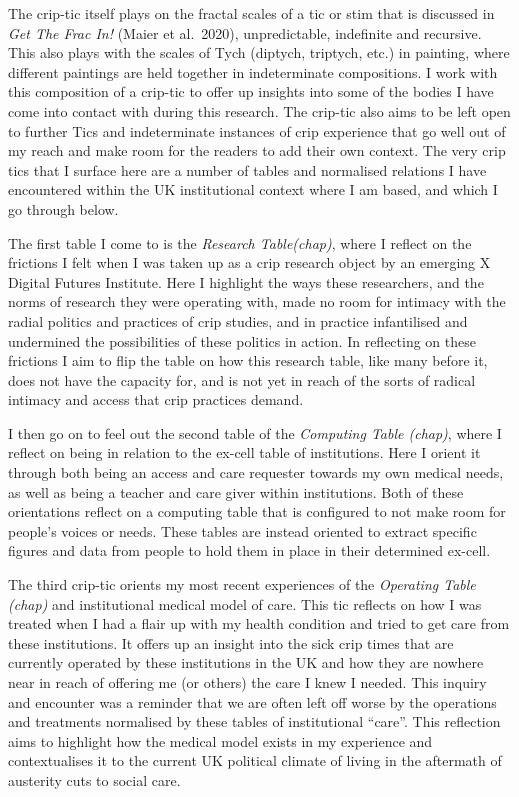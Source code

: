 The crip-tic itself plays on the fractal scales of a tic or stim that is
discussed in \emph{Get The Frac In!} (Maier et al.~2020), unpredictable,
indefinite and recursive. This also plays with the scales of Tych
(diptych, triptych, etc.) in painting, where different paintings are
held together in indeterminate compositions. I work with this
composition of a crip-tic to offer up insights into some of the bodies I
have come into contact with during this research. The crip-tic also aims
to be left open to further Tics and indeterminate instances of crip
experience that go well out of my reach and make room for the readers to
add their own context. The very crip tics that I surface here are a
number of tables and normalised relations I have encountered within the
UK institutional context where I am based, and which I go through below.

The first table I come to is the \emph{Research Table(chap)}, where I
reflect on the frictions I felt when I was taken up as a crip research
object by an emerging X Digital Futures Institute. Here I highlight the
ways these researchers, and the norms of research they were operating
with, made no room for intimacy with the radial politics and practices
of crip studies, and in practice infantilised and undermined the
possibilities of these politics in action. In reflecting on these
frictions I aim to flip the table on how this research table, like many
before it, does not have the capacity for, and is not yet in reach of
the sorts of radical intimacy and access that crip practices demand.

I then go on to feel out the second table of the \emph{Computing Table
(chap)}, where I reflect on being in relation to the ex-cell table of
institutions. Here I orient it through both being an access and care
requester towards my own medical needs, as well as being a teacher and
care giver within institutions. Both of these orientations reflect on a
computing table that is configured to not make room for people's voices
or needs. These tables are instead oriented to extract specific figures
and data from people to hold them in place in their determined ex-cell.

The third crip-tic orients my most recent experiences of the
\emph{Operating Table (chap)} and institutional medical model of care.
This tic reflects on how I was treated when I had a flair up with my
health condition and tried to get care from these institutions. It
offers up an insight into the sick crip times that are currently
operated by these institutions in the UK and how they are nowhere near
in reach of offering me (or others) the care I knew I needed. This
inquiry and encounter was a reminder that we are often left off worse by
the operations and treatments normalised by these tables of
institutional ``care''. This reflection aims to highlight how the
medical model exists in my experience and contextualises it to the
current UK political climate of living in the aftermath of austerity
cuts to social care.

